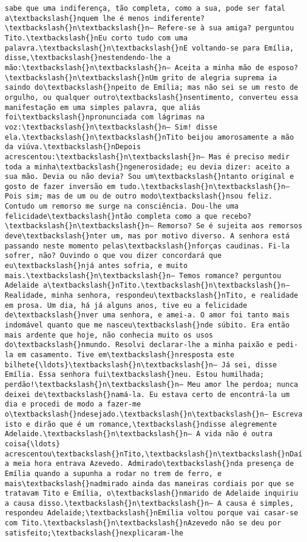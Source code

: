 \documentclass[11pt]{article}
\begin{document}
\begin{Verbatim}[commandchars=\\\{\}]
sabe que uma indiferença, tão completa, como a sua, pode ser fatal a\textbackslash{}nquem lhe é menos indiferente?\textbackslash{}n\textbackslash{}n— Refere-se à sua amiga? perguntou Tito.\textbackslash{}nEu corto tudo com uma palavra.\textbackslash{}n\textbackslash{}nE voltando-se para Emília, disse,\textbackslash{}nestendendo-lhe a mão:\textbackslash{}n\textbackslash{}n— Aceita a minha mão de esposo?\textbackslash{}n\textbackslash{}nUm grito de alegria suprema ia saindo do\textbackslash{}npeito de Emília; mas não sei se um resto de orgulho, ou qualquer outro\textbackslash{}nsentimento, converteu essa manifestação em uma simples palavra, que aliás foi\textbackslash{}npronunciada com lágrimas na voz:\textbackslash{}n\textbackslash{}n— Sim! disse ela.\textbackslash{}n\textbackslash{}nTito beijou amorosamente a mão da viúva.\textbackslash{}nDepois acrescentou:\textbackslash{}n\textbackslash{}n— Mas é preciso medir toda a minha\textbackslash{}ngenerosidade; eu devia dizer: aceito a sua mão. Devia ou não devia? Sou um\textbackslash{}ntanto original e gosto de fazer inversão em tudo.\textbackslash{}n\textbackslash{}n— Pois sim; mas de um ou de outro modo\textbackslash{}nsou feliz. Contudo um remorso me surge na consciência. Dou-lhe uma felicidade\textbackslash{}ntão completa como a que recebo?\textbackslash{}n\textbackslash{}n— Remorso? Se é sujeita aos remorsos deve\textbackslash{}nter um, mas por motivo diverso. A senhora está passando neste momento pelas\textbackslash{}nforças caudinas. Fi-la sofrer, não? Ouvindo o que vou dizer concordará que eu\textbackslash{}njá antes sofria, e muito mais.\textbackslash{}n\textbackslash{}n— Temos romance? perguntou Adelaide a\textbackslash{}nTito.\textbackslash{}n\textbackslash{}n— Realidade, minha senhora, respondeu\textbackslash{}nTito, e realidade em prosa. Um dia, há já alguns anos, tive eu a felicidade de\textbackslash{}nver uma senhora, e amei-a. O amor foi tanto mais indomável quanto que me nasceu\textbackslash{}nde súbito. Era então mais ardente que hoje, não conhecia muito os usos do\textbackslash{}nmundo. Resolvi declarar-lhe a minha paixão e pedi-la em casamento. Tive em\textbackslash{}nresposta este bilhete{\ldots}\textbackslash{}n\textbackslash{}n— Já sei, disse Emília. Essa senhora fui\textbackslash{}neu. Estou humilhada; perdão!\textbackslash{}n\textbackslash{}n— Meu amor lhe perdoa; nunca deixei de\textbackslash{}namá-la. Eu estava certo de encontrá-la um dia e procedi de modo a fazer-me o\textbackslash{}ndesejado.\textbackslash{}n\textbackslash{}n— Escreva isto e dirão que é um romance,\textbackslash{}ndisse alegremente Adelaide.\textbackslash{}n\textbackslash{}n— A vida não é outra coisa{\ldots} acrescentou\textbackslash{}nTito,\textbackslash{}n\textbackslash{}nDaí a meia hora entrava Azevedo. Admirado\textbackslash{}nda presença de Emília quando a supunha a rodar no trem de ferro, e mais\textbackslash{}nadmirado ainda das maneiras cordiais por que se tratavam Tito e Emília, o\textbackslash{}nmarido de Adelaide inquiriu a causa disso.\textbackslash{}n\textbackslash{}n— A causa é simples, respondeu Adelaide;\textbackslash{}nEmília voltou porque vai casar-se com Tito.\textbackslash{}n\textbackslash{}nAzevedo não se deu por satisfeito;\textbackslash{}nexplicaram-lhe 
\end{Verbatim}
\end{document}
